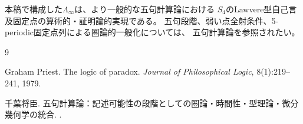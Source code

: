 \documentclass[11pt,a4paper]{ltjsarticle}
\theoremstyle{definition}
\newcommand{\LawvereInfinity}{\Lambda_\infty}
\begin{document}
本稿で構成した$\LawvereInfinity$は、より一般的な五句計算論における
$S_4$のLawvere型自己言及固定点の算術的・証明論的実現である。
五句段階、弱い点全射条件、5-periodic固定点列による圏論的一般化については、
五句計算論\cite{Chiba2026Penta}を参照されたい。


\begin{thebibliography}{9}

Graham Priest.
\newblock The logic of paradox.
\newblock \emph{Journal of Philosophical Logic}, 8(1):219--241, 1979.

千葉将臣.
\newblock 五句計算論：記述可能性の段階としての圏論・時間性・型理論・微分幾何学の統合.
.

\end{thebibliography}
\end{document}
